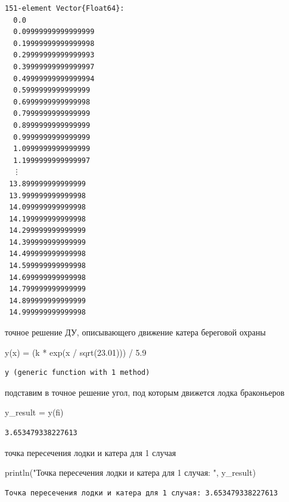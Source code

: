 \documentclass[
  12pt,
  a4paper,
  DIV=11,
  numbers=noendperiod]{scrreprt}
\newenvironment{Shaded}{\begin{snugshade}}{\end{snugshade}}
\newcommand{\FloatTok}[1]{\textcolor[rgb]{0.68,0.00,0.00}{#1}}
\newcommand{\FunctionTok}[1]{\textcolor[rgb]{0.28,0.35,0.67}{#1}}
\newcommand{\NormalTok}[1]{\textcolor[rgb]{0.00,0.23,0.31}{#1}}
\newcommand{\OperatorTok}[1]{\textcolor[rgb]{0.37,0.37,0.37}{#1}}
\newcommand{\StringTok}[1]{\textcolor[rgb]{0.13,0.47,0.30}{#1}}
\begin{document}
\begin{verbatim}
151-element Vector{Float64}:
  0.0
  0.09999999999999999
  0.19999999999999998
  0.29999999999999993
  0.39999999999999997
  0.49999999999999994
  0.5999999999999999
  0.6999999999999998
  0.7999999999999999
  0.8999999999999999
  0.9999999999999999
  1.0999999999999999
  1.1999999999999997
  ⋮
 13.899999999999999
 13.999999999999998
 14.099999999999998
 14.199999999999998
 14.299999999999999
 14.399999999999999
 14.499999999999998
 14.599999999999998
 14.699999999999998
 14.799999999999999
 14.899999999999999
 14.999999999999998
\end{verbatim}

точное решение ДУ, описывающего движение катера береговой охраны

\begin{Shaded}
\begin{Highlighting}[]
\FunctionTok{y}\NormalTok{(x) }\OperatorTok{=}\NormalTok{ (k }\OperatorTok{*} \FunctionTok{exp}\NormalTok{(x }\OperatorTok{/} \FunctionTok{sqrt}\NormalTok{(}\FloatTok{23.01}\NormalTok{))) }\OperatorTok{/} \FloatTok{5.9}
\end{Highlighting}
\end{Shaded}

\begin{verbatim}
y (generic function with 1 method)
\end{verbatim}

подставим в точное решение угол, под которым движется лодка браконьеров

\begin{Shaded}
\begin{Highlighting}[]
\NormalTok{y\_result }\OperatorTok{=} \FunctionTok{y}\NormalTok{(fi)}
\end{Highlighting}
\end{Shaded}

\begin{verbatim}
3.653479338227613
\end{verbatim}

точка пересечения лодки и катера для 1 случая

\begin{Shaded}
\begin{Highlighting}[]
\FunctionTok{println}\NormalTok{(}\StringTok{"Точка пересечения лодки и катера для 1 случая: "}\NormalTok{, y\_result)}
\end{Highlighting}
\end{Shaded}

\begin{verbatim}
Точка пересечения лодки и катера для 1 случая: 3.653479338227613
\end{verbatim}
\end{document}
